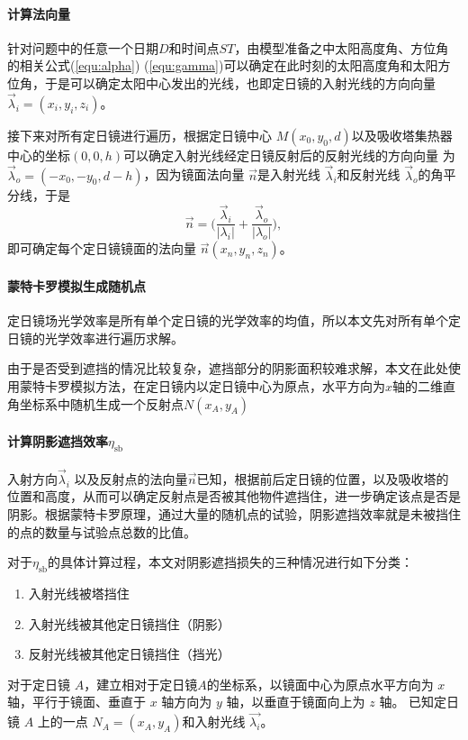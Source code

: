 \documentclass[../main.tex]{subfiles}
\begin{document}
\paragraph{计算法向量}
针对问题中的任意一个日期\(D\)和时间点\(ST\)，由模型准备之中太阳高度角、方位角的相关公式(\ref{equ:alpha}) (\ref{equ:gamma})可以确定在此时刻的太阳高度角和太阳方位角，于是可以确定太阳中心发出的光线，也即定日镜的入射光线的方向向量\(\vec \lambda_i=(x_i,y_i,z_i)\)。

接下来对所有定日镜进行遍历，根据定日镜中心
\(M(x_0,y_0,d)\)以及吸收塔集热器中心的坐标\((0,0,h)\)可以确定入射光线经定日镜反射后的反射光线的方向向量
为 \(\vec \lambda_o  = (−x_0,−y_0, d −h)\)，因为镜面法向量 \(\vec n\)是入射光线 \(\vec \lambda _{i}\)和反射光线 \(\vec \lambda _{o}\)的角平分线，于是
\begin{equation}
\vec n = \big(\frac{\vec \lambda_{i}}{\vert \lambda_{i} \vert} + \frac{\vec \lambda_{o}}{\vert \lambda_{o} \vert}\big),
\end{equation}
即可确定每个定日镜镜面的法向量 \(\vec n (x_{n}, y_{n}, z_{n})\)。

\paragraph{蒙特卡罗模拟生成随机点}
定日镜场光学效率是所有单个定日镜的光学效率的均值，所以本文先对所有单个定日镜的光学效率进行遍历求解。

由于是否受到遮挡的情况比较复杂，遮挡部分的阴影面积较难求解，本文在此处使用蒙特卡罗模拟方法，在定日镜内以定日镜中心为原点，水平方向为\(x\)轴的二维直角坐标系中随机生成一个反射点\(N(x_A,y_A)\)

\paragraph{计算阴影遮挡效率\(\eta_{\mathrm{s b}}\)} 入射方向\(\vec \lambda _{i}\) 以及反射点的法向量\(\vec n\)已知，根据前后定日镜的位置，以及吸收塔的位置和高度，从而可以确定反射点是否被其他物件遮挡住，进一步确定该点是否是阴影。根据蒙特卡罗原理，通过大量的随机点的试验，阴影遮挡效率就是未被挡住的点的数量与试验点总数的比值。

对于\(\eta _{\mathrm{s b}}\)的具体计算过程，本文对阴影遮挡损失的三种情况进行如下分类：
\begin{enumerate}
\item 入射光线被塔挡住
\item 入射光线被其他定日镜挡住（阴影）
\item 反射光线被其他定日镜挡住（挡光）
\end{enumerate}
对于定日镜 \(A\)，建立相对于定日镜\(A\)的坐标系，以镜面中心为原点水平方向为 \(x\) 轴，平行于镜面、垂直于 \(x\) 轴方向为 \(y\) 轴，以垂直于镜面向上为 \(z\) 轴。
已知定日镜 \(A\) 上的一点 \(N_{A} = (x_{A}, y_{A})\)和入射光线 \(\vec {\lambda _{i}}\)。
\end{document}
